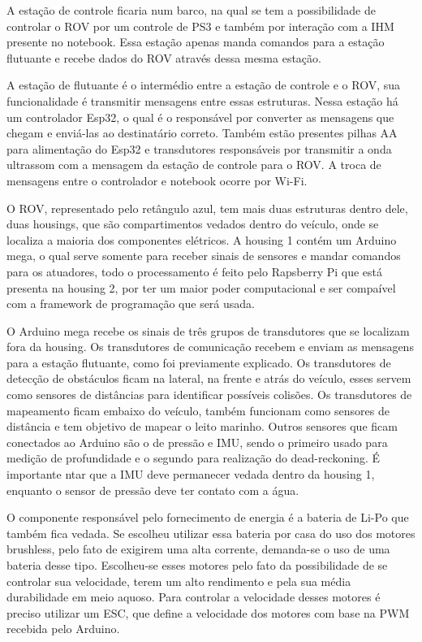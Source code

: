 A estação de controle ficaria num barco, na qual se tem a possibilidade de controlar o ROV por um controle de PS3 e também por interação com a IHM presente no notebook. Essa estação apenas manda comandos para a estação flutuante e recebe dados do ROV através dessa mesma estação.

A estação de flutuante é o intermédio entre a estação de controle e o ROV, sua funcionalidade é transmitir mensagens entre essas estruturas. Nessa estação há um controlador Esp32, o qual é o responsável por converter as mensagens que chegam e enviá-las ao destinatário correto. Também estão presentes pilhas AA para alimentação do Esp32 e transdutores responsáveis por transmitir a onda ultrassom com a mensagem da estação de controle para o ROV. A troca de mensagens entre o controlador e notebook ocorre por Wi-Fi.

O ROV, representado pelo retângulo azul, tem mais duas estruturas dentro dele, duas housings, que são compartimentos vedados dentro do veículo, onde se localiza a maioria dos componentes elétricos. A housing 1 contém um Arduino mega, o qual serve somente para receber sinais de sensores e mandar comandos para os atuadores, todo o processamento é feito pelo Rapsberry Pi que está presenta na housing 2, por ter um maior poder computacional e ser compaível com a framework de programação que será usada. 

O Arduino mega recebe os sinais de três grupos de transdutores que se localizam fora da housing. Os transdutores de comunicação recebem e enviam as mensagens para a estação flutuante, como foi previamente explicado. Os transdutores de detecção de obstáculos ficam na lateral, na frente e atrás do veículo, esses servem como sensores de distâncias para identificar possíveis colisões. Os transdutores de mapeamento ficam embaixo do veículo, também funcionam como sensores de distância e tem objetivo de mapear o leito marinho. Outros sensores que ficam conectados ao Arduino são o de pressão e IMU, sendo o primeiro usado para medição de profundidade e o segundo para realização do dead-reckoning. É importante ntar que a IMU deve permanecer vedada dentro da housing 1, enquanto o sensor de pressão deve ter contato com a água.

O componente responsável pelo fornecimento de energia é a bateria de Li-Po que também fica vedada. Se escolheu utilizar essa bateria por casa do uso dos motores brushless, pelo fato de exigirem uma alta corrente, demanda-se o uso de uma bateria desse tipo. Escolheu-se esses motores pelo fato da possibilidade de se controlar sua velocidade, terem um alto rendimento e pela sua média durabilidade em meio aquoso. Para controlar a velocidade desses motores é preciso utilizar um ESC, que define a velocidade dos motores com base na PWM recebida pelo Arduino. 

